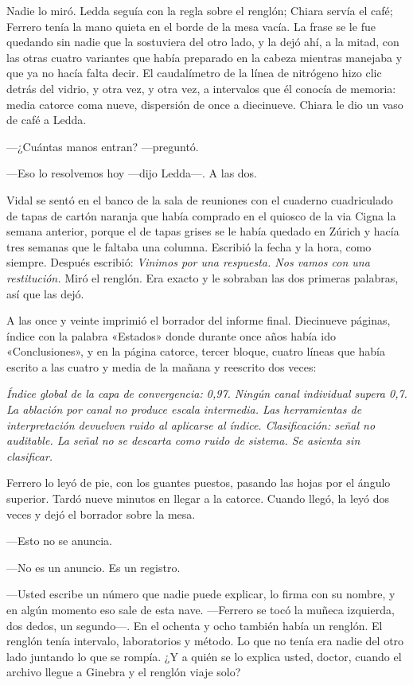Nadie lo miró. Ledda seguía con la regla sobre el renglón; Chiara servía el café; Ferrero tenía la mano quieta en el borde de la mesa vacía. La frase se le fue quedando sin nadie que la sostuviera del otro lado, y la dejó ahí, a la mitad, con las otras cuatro variantes que había preparado en la cabeza mientras manejaba y que ya no hacía falta decir. El caudalímetro de la línea de nitrógeno hizo clic detrás del vidrio, y otra vez, y otra vez, a intervalos que él conocía de memoria: media catorce coma nueve, dispersión de once a diecinueve. Chiara le dio un vaso de café a Ledda.

---¿Cuántas manos entran? ---preguntó.

---Eso lo resolvemos hoy ---dijo Ledda---. A las dos.

Vidal se sentó en el banco de la sala de reuniones con el cuaderno cuadriculado de tapas de cartón naranja que había comprado en el quiosco de la via Cigna la semana anterior, porque el de tapas grises se le había quedado en Zúrich y hacía tres semanas que le faltaba una columna. Escribió la fecha y la hora, como siempre. Después escribió: \textit{Vinimos por una respuesta. Nos vamos con una restitución.} Miró el renglón. Era exacto y le sobraban las dos primeras palabras, así que las dejó.

A las once y veinte imprimió el borrador del informe final. Diecinueve páginas, índice con la palabra «Estados» donde durante once años había ido «Conclusiones», y en la página catorce, tercer bloque, cuatro líneas que había escrito a las cuatro y media de la mañana y reescrito dos veces:

\textit{Índice global de la capa de convergencia: 0,97. Ningún canal individual supera 0,7. La ablación por canal no produce escala intermedia. Las herramientas de interpretación devuelven ruido al aplicarse al índice. Clasificación: señal no auditable. La señal no se descarta como ruido de sistema. Se asienta sin clasificar.}

Ferrero lo leyó de pie, con los guantes puestos, pasando las hojas por el ángulo superior. Tardó nueve minutos en llegar a la catorce. Cuando llegó, la leyó dos veces y dejó el borrador sobre la mesa.

---Esto no se anuncia.

---No es un anuncio. Es un registro.

---Usted escribe un número que nadie puede explicar, lo firma con su nombre, y en algún momento eso sale de esta nave. ---Ferrero se tocó la muñeca izquierda, dos dedos, un segundo---. En el ochenta y ocho también había un renglón. El renglón tenía intervalo, laboratorios y método. Lo que no tenía era nadie del otro lado juntando lo que se rompía. ¿Y a quién se lo explica usted, doctor, cuando el archivo llegue a Ginebra y el renglón viaje solo?

